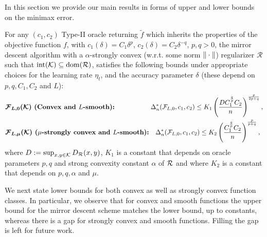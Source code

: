 
In this section we provide our main results in forms of upper and lower bounds on the minimax error.
\begin{theorem}
\label{thm:ub}
For any $(c_1,c_2)$ Type-II oracle returning $\tilde{f}$ which inherits the properties of the objective function $f$,
 with $c_1(\delta) = C_1 \delta^p$, $c_2(\delta) = C_2 \delta^{-q}$, $p,q>0$,
the mirror descent algorithm \citep{NeYu83}
with a $\alpha$-strongly convex (w.r.t. some norm $\|\cdot\|$) regularizer $\mathcal{R}$ such that $\operatorname{int}(\mathcal{K})\subseteq \operatorname{dom}(\mathcal{R})$,
satisfies the following bounds under appropriate choices for the learning rate $\eta_t$, and the accuracy parameter $\delta$ (these depend on $p, q, C_1, C_2$ and $L$):
\vspace*{-0.17in}
\begin{align*}
&\textbf{$\bm{\mathcal{F}_{L,0}(\mathcal{K})}$ (Convex and $L$-smooth):} \hspace{5.5em} \Delta_n^{*}(\mathcal{F}_{L,0}, c_1,c_2) \le K_1\left(\dfrac{D {C_1^{\frac{q}{p}} C_2}}{ n}\right)^{\frac{p}{2p+q}},\\
&\textbf{$\bm{\mathcal{F}_{L,\mu}(\mathcal{K})}$ ($\mu$-strongly convex and $L$-smooth):} \hspace{1em}
\Delta_n^{*}(\mathcal{F}_{L,0}, c_1,c_2) \le K_2\left(\dfrac{C_1^{\frac{q}{p}} C_2}{ n}\right)^{\frac{p}{p+q}},
\end{align*}
where $D:=\sup_{x,y\in \mathcal{K}} D_{\mathcal{R}}(x,y)$, $K_1$ is a constant that depends on oracle parameters $p, q$ and strong convexity constant $\alpha$ of $\cal R$ and
where $K_2$ is a constant that depends on $p, q, \alpha$ and $\mu$.
\end{theorem}
We next state lower bounds for both convex as well as strongly convex function classes. In particular, we observe that for convex and smooth functions the upper bound for the mirror descent scheme matches the lower bound, up to constants, whereas there is a gap for strongly convex and smooth functions.
Filling the gap is left for future work.
